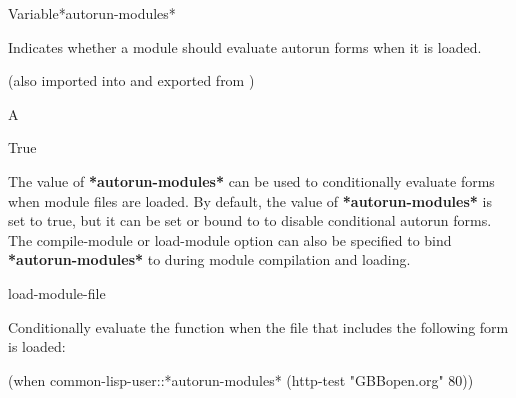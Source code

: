\documentclass[10pt,twoside,english,pdftex]{article}
\begin{document}
\begin{functiondoc}{Variable}{*autorun-modules*}{}%

\fnsyntax

\fnpurpose Indicates whether a module should evaluate autorun forms when it is
loaded.

\fnpackage {}
(also imported into and exported from )

\fnmodule {}

\fnvaluetype A 

\fninitialvalue True

\fndescription The value of \textbf{*autorun-modules*} can be used to
conditionally evaluate forms when module files are loaded.  By default, the
value of \textbf{*autorun-modules*} is set to true, but it can be set or bound
to  to disable conditional autorun forms.  The compile-module or
load-module option  can also be specified to bind
\textbf{*autorun-modules*} to  during module compilation and loading.

\begin{alsos}{load-module-file}
\end{alsos}

\fnexample
Conditionally evaluate the  function when the file 
 that includes the following form is loaded:
\begin{example}
  (when common-lisp-user::*autorun-modules*
    (http-test "GBBopen.org" 80))
\end{example}

\end{functiondoc}

\end{document}
